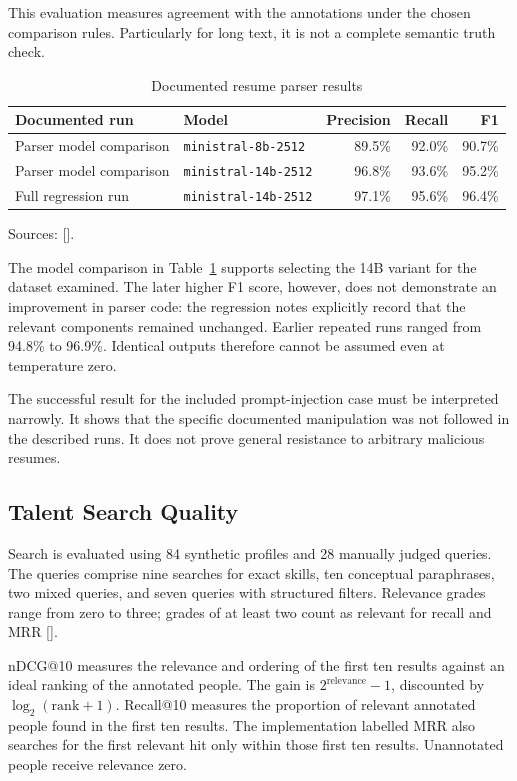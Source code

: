 \documentclass[11pt,a4paper]{article}
\newcommand{\code}[1]{\texttt{#1}}
\newcommand{\reflink}[1]{\hyperlink{ref:#1}{#1}}
\newcommand{\refsep}{}
\newcommand{\refs}[1]{\begingroup
  \gdef\refsep{}%
  \renewcommand*{\do}[1]{\refsep\reflink{##1}\gdef\refsep{, }}%
  [\docsvlist{#1}]\endgroup}
\begin{document}
This evaluation measures agreement with the annotations under the chosen comparison rules. Particularly for long text, it is not a complete semantic truth check.

\begin{table}[htbp]
\centering
\caption{Documented resume parser results}
\label{tab:parser}
\begin{tabular}{@{}llrrr@{}}
\toprule
\textbf{Documented run} & \textbf{Model} & \textbf{Precision} & \textbf{Recall} & \textbf{F1} \\
\midrule
Parser model comparison & \code{ministral-8b-2512} & 89.5\% & 92.0\% & 90.7\% \\
Parser model comparison & \code{ministral-14b-2512} & 96.8\% & 93.6\% & 95.2\% \\
Full regression run & \code{ministral-14b-2512} & 97.1\% & 95.6\% & 96.4\% \\
\bottomrule
\end{tabular}
\par\smallskip\footnotesize Sources: \refs{P5,P10}.
\end{table}

The model comparison in Table~\ref{tab:parser} supports selecting the 14B variant for the dataset examined. The later higher F1 score, however, does not demonstrate an improvement in parser code: the regression notes explicitly record that the relevant components remained unchanged. Earlier repeated runs ranged from 94.8\% to 96.9\%. Identical outputs therefore cannot be assumed even at temperature zero.

The successful result for the included prompt-injection case must be interpreted narrowly. It shows that the specific documented manipulation was not followed in the described runs. It does not prove general resistance to arbitrary malicious resumes.

\subsection{Talent Search Quality}

Search is evaluated using 84 synthetic profiles and 28 manually judged queries. The queries comprise nine searches for exact skills, ten conceptual paraphrases, two mixed queries, and seven queries with structured filters. Relevance grades range from zero to three; grades of at least two count as relevant for recall and MRR \refs{P6}.

nDCG@10 measures the relevance and ordering of the first ten results against an ideal ranking of the annotated people. The gain is $2^{\mathrm{relevance}} - 1$, discounted by $\log_2(\mathrm{rank} + 1)$. Recall@10 measures the proportion of relevant annotated people found in the first ten results. The implementation labelled MRR also searches for the first relevant hit only within those first ten results. Unannotated people receive relevance zero.
\end{document}
